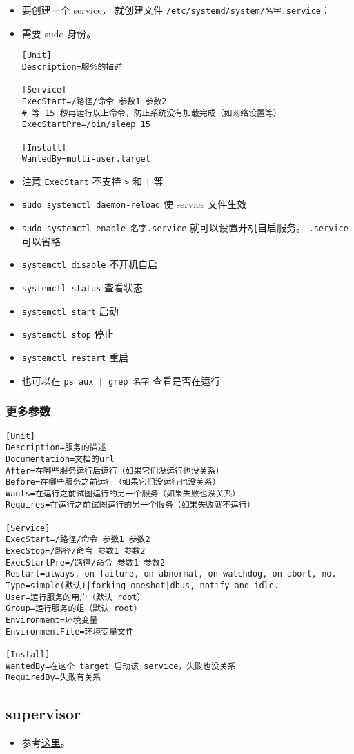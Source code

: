 
\begin{issues}
\issueDraft
\end{issues}

\begin{itemize}
\item 要创建一个 service， 就创建文件 \verb|/etc/systemd/system/名字.service|：
\item 需要 sudo 身份。
\begin{lstlisting}[language=none,caption=名字.service]
[Unit]
Description=服务的描述

[Service]
ExecStart=/路径/命令 参数1 参数2
# 等 15 秒再运行以上命令，防止系统没有加载完成（如网络设置等）
ExecStartPre=/bin/sleep 15

[Install]
WantedBy=multi-user.target
\end{lstlisting}
\item 注意 \verb|ExecStart| 不支持 \verb|>| 和 \verb`|` 等
\item \verb|sudo systemctl daemon-reload| 使 service 文件生效
\item \verb|sudo systemctl enable 名字.service| 就可以设置开机自启服务。 \verb`.service` 可以省略
\item \verb|systemctl disable| 不开机自启
\item \verb|systemctl status| 查看状态
\item \verb|systemctl start| 启动
\item \verb|systemctl stop| 停止
\item \verb|systemctl restart| 重启
\item 也可以在 \verb`ps aux | grep 名字` 查看是否在运行
\end{itemize}

\subsubsection{更多参数}
\begin{lstlisting}[language=none,caption=名字.service]
[Unit]
Description=服务的描述
Documentation=文档的url
After=在哪些服务运行后运行（如果它们没运行也没关系）
Before=在哪些服务之前运行（如果它们没运行也没关系）
Wants=在运行之前试图运行的另一个服务（如果失败也没关系）
Requires=在运行之前试图运行的另一个服务（如果失败就不运行）

[Service]
ExecStart=/路径/命令 参数1 参数2
ExecStop=/路径/命令 参数1 参数2
ExecStartPre=/路径/命令 参数1 参数2
Restart=always, on-failure, on-abnormal, on-watchdog, on-abort, no.
Type=simple(默认)|forking|oneshot|dbus, notify and idle.
User=运行服务的用户（默认 root）
Group=运行服务的组（默认 root）
Environment=环境变量
EnvironmentFile=环境变量文件

[Install]
WantedBy=在这个 target 启动该 service，失败也没关系
RequiredBy=失败有关系
\end{lstlisting}


\subsection{supervisor}
\begin{itemize}
\item 参考\href{https://www.digitalocean.com/community/tutorials/how-to-install-and-manage-supervisor-on-ubuntu-and-debian-vps}{这里}。
\end{itemize}
